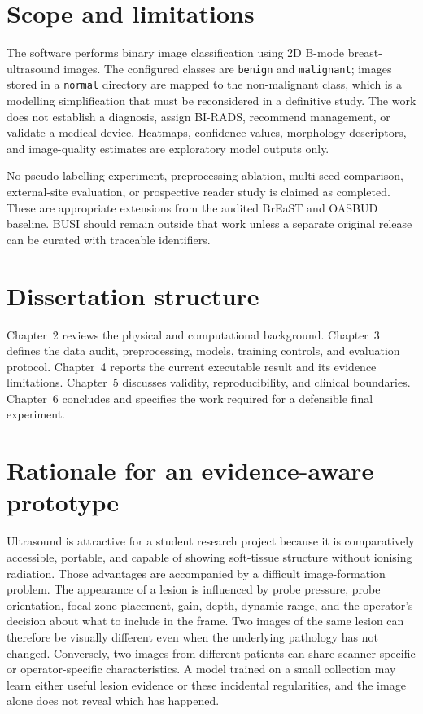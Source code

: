 \section{Scope and limitations}
The software performs binary image classification using 2D B-mode breast-ultrasound images. The configured classes are \texttt{benign} and \texttt{malignant}; images stored in a \texttt{normal} directory are mapped to the non-malignant class, which is a modelling simplification that must be reconsidered in a definitive study. The work does not establish a diagnosis, assign BI-RADS, recommend management, or validate a medical device. Heatmaps, confidence values, morphology descriptors, and image-quality estimates are exploratory model outputs only.

No pseudo-labelling experiment, preprocessing ablation, multi-seed comparison, external-site evaluation, or prospective reader study is claimed as completed. These are appropriate extensions from the audited BrEaST and OASBUD baseline. BUSI should remain outside that work unless a separate original release can be curated with traceable identifiers.

\section{Dissertation structure}
Chapter~2 reviews the physical and computational background. Chapter~3 defines the data audit, preprocessing, models, training controls, and evaluation protocol. Chapter~4 reports the current executable result and its evidence limitations. Chapter~5 discusses validity, reproducibility, and clinical boundaries. Chapter~6 concludes and specifies the work required for a defensible final experiment.

\section{Rationale for an evidence-aware prototype}
Ultrasound is attractive for a student research project because it is comparatively accessible, portable, and capable of showing soft-tissue structure without ionising radiation. Those advantages are accompanied by a difficult image-formation problem. The appearance of a lesion is influenced by probe pressure, probe orientation, focal-zone placement, gain, depth, dynamic range, and the operator's decision about what to include in the frame. Two images of the same lesion can therefore be visually different even when the underlying pathology has not changed. Conversely, two images from different patients can share scanner-specific or operator-specific characteristics. A model trained on a small collection may learn either useful lesion evidence or these incidental regularities, and the image alone does not reveal which has happened.

